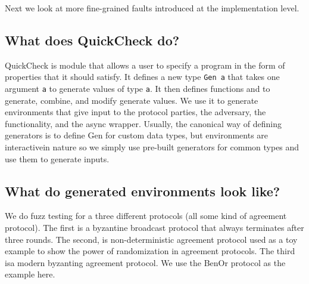 Next we look at more fine-grained faults introduced at the implementation level.  







\subsection{What does QuickCheck do?}
QuickCheck is module that allows a user to specify a program in the form of properties that it should satisfy. 
It defines a new type \texttt{Gen a} that takes one argument \texttt{a} to generate values of type \texttt{a}. 
It then defines functions and to generate, combine, and modify generate values. 
We use it to generate environments that give input to the protocol parties, the adversary, the functionality, and the async wrapper.
Usually, the canonical way of defining generators is to define Gen for custom data types, but environments are interactivein nature so we simply use pre-built generators for common types and use them to generate inputs.

\subsection{What do generated environments look like?}
We do fuzz testing for a three different protocols (all some kind of agreement protocol). 
The first is a byzantine broadcast protocol that always terminates after three rounds. 
The second, is non-deterministic agreement protocol used as a toy example to show the power of randomization in agreement protocols. 
The third isa modern byzanting agreement protocol.
We use the BenOr protocol as the example here. 

